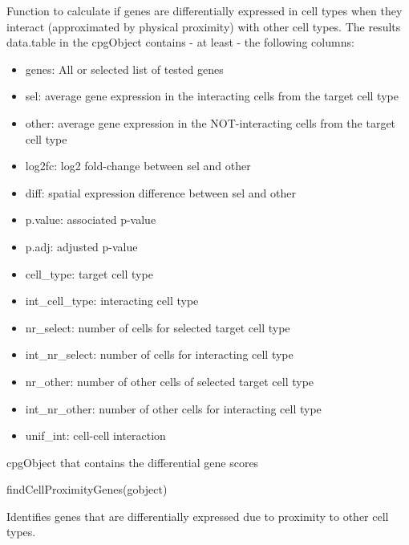 \documentclass[a4paper]{book}
\begin{document}
\begin{Details}\relax
Function to calculate if genes are differentially expressed in cell types
when they interact (approximated by physical proximity) with other cell types.
The results data.table in the cpgObject contains - at least - the following columns:
\begin{itemize}

\item{} genes: All or selected list of tested genes
\item{} sel: average gene expression in the interacting cells from the target cell type 
\item{} other: average gene expression in the NOT-interacting cells from the target cell type 
\item{} log2fc: log2 fold-change between sel and other
\item{} diff: spatial expression difference between sel and other
\item{} p.value: associated p-value
\item{} p.adj: adjusted p-value
\item{} cell\_type: target cell type
\item{} int\_cell\_type: interacting cell type
\item{} nr\_select: number of cells for selected target cell type
\item{} int\_nr\_select: number of cells for interacting cell type
\item{} nr\_other: number of other cells of selected target cell type
\item{} int\_nr\_other: number of other cells for interacting cell type
\item{} unif\_int: cell-cell interaction

\end{itemize}

\end{Details}
%
\begin{Value}
cpgObject that contains the differential gene scores
\end{Value}
%
\begin{Examples}
\begin{ExampleCode}
    findCellProximityGenes(gobject)
\end{ExampleCode}
\end{Examples}
%
\begin{Description}\relax
Identifies genes that are differentially expressed due to proximity to other cell types.
\end{Description}
\end{document}
